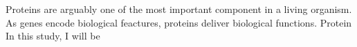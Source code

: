 Proteins are arguably one of the most important component in a living organism. As genes encode biological feactures, proteins deliver biological functions. Protein In this study, I will be 